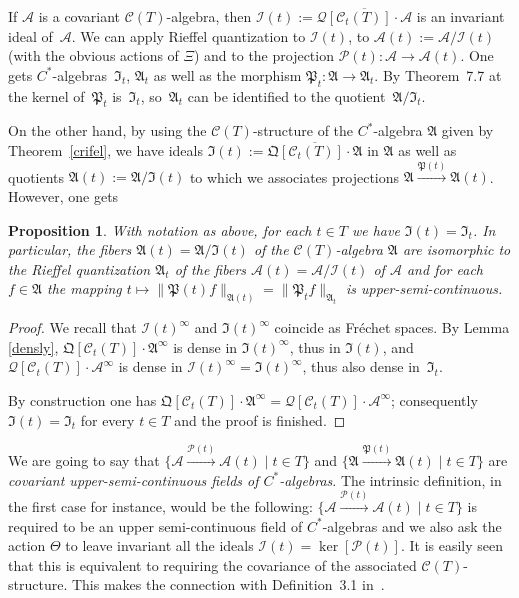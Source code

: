 \documentclass[pdftex]{sigma}
\def\A{{\mathcal A}}
\def\Th{\Theta}
\def\QQ{\mathfrak Q}
\def\AA{\mathfrak A}
\def\C{\mathcal{C}}
\def\Q{\mathcal Q}
\def\P{\mathcal P}
\def\PP{{\mathfrak P}}
\newtheorem{Proposition}[Theorem]{Proposition}
{\theoremstyle{definition}
\newtheorem{Definition}[Theorem]{Definition}
\newtheorem{Example}[Theorem]{Example}
\newtheorem{Remark}[Theorem]{Remark}
}
\begin{document}
If $\A$ is a covariant $\C(T)$-algebra, then $\mathcal I(t):=\overline{\Q\left[\C_t(T)\right]\cdot\A}$
is an invariant ideal of~$\A$. We can apply Rief\/fel quantization to
$\mathcal I(t)$, to $\A(t):=\A/\mathcal I(t)$ (with the obvious actions of $\Xi$) and to the projection
$\mathcal P(t):\A\rightarrow\A(t)$. One gets $C^*$-algebras~$\mathfrak I_t$, $\AA_t$ as well as the
morphism $\mathfrak P_t:\AA\rightarrow\AA_t$. By Theorem~7.7 at~\cite{Rie1} the kernel of~$\mathfrak P_t$ is~$\mathfrak I_t$, so~$\AA_t$ can be identif\/ied to the quotient~$\AA/\mathfrak I_t$.

On the other hand, by using the $\C(T)$-structure of the $C^*$-algebra $\AA$ given by Theorem~\ref{crifel}, we have ideals
$\mathfrak I(t):=\overline{\QQ\left[\C_t(T)\right]\cdot\AA}$ in $\AA$ as well as quotients $\AA(t):=\AA/\mathfrak I(t)$
to which we associates projections $\AA\overset{\PP(t)}{\longrightarrow}\AA(t)$.
However, one gets

\begin{Proposition}\label{pieligroasa}
With notation as above, for each $t\in T$ we have $\mathfrak I(t)=\mathfrak I_t$.
In particular, the fibers $\AA(t)=\AA/\mathfrak I(t)$ of  the $\C(T)$-algebra $\AA$ are isomorphic
to the Rieffel quantization $\AA_t$ of the fibers $\A(t)=\A/\mathcal I(t)$ of $\A$ and for each
$f\in\AA$ the mapping $t\mapsto\| \mathfrak P(t)f\|_{\AA(t)}=\| \PP_t f\|_{\AA_t}$
is upper-semi-continuous.
\end{Proposition}

\begin{proof}
We recall that $\mathcal I(t)^\infty$ and $\mathfrak I(t)^\infty$ coincide as Fr\'echet spaces.
By Lemma \ref{densly}, $\QQ\left[\C_t(T)\right]\cdot\AA^\infty$ is dense in $\mathfrak I(t)^\infty$,
thus in $\mathfrak I(t)$, and
$\Q\left[\C_t(T)\right]\cdot\A^\infty$ is dense in $\mathcal I(t)^\infty=\mathfrak I(t)^\infty$,
thus also dense in~$\mathfrak I_t$.

By construction one has $\QQ\left[\C_t(T)\right]\cdot\AA^\infty=\Q\left[\C_t(T)\right]\cdot\A^\infty$;
consequently $\mathfrak I(t)=\mathfrak I_t$ for every $t\in T$ and the proof is f\/inished.
\end{proof}

\begin{Remark}\label{spekul}
We are going to say that
$\big\{\mathcal A\overset{\P(t)}{\longrightarrow}\mathcal A(t)\mid t\in T\big\}$ and
$\big\{\AA\overset{\PP(t)}{\longrightarrow}\AA(t)\mid t\in T\big\}$ are {\it covariant upper-semi-continuous fields of
$C^*$-algebras}.
The intrinsic def\/inition, in the f\/irst case for instance, would be the following:
$\big\{\mathcal A\overset{\P(t)}{\longrightarrow}\mathcal A(t)\mid t\in T\big\}$ is required to be an upper semi-continuous
f\/ield of $C^*$-algebras and we also ask the action $\Th$ to leave invariant all the ideals
$\mathcal I(t)=\ker[\P(t)]$. It is easily seen that this is equivalent to requiring the covariance of the associated
$\C(T)$-structure. This makes the connection with Def\/inition~3.1 in~\cite{Rie}.
\end{Remark}
\end{document}
